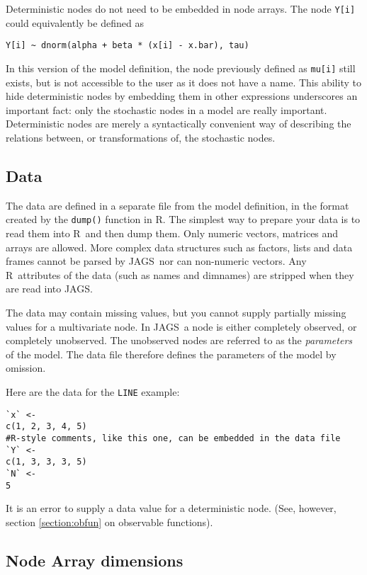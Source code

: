 \documentclass[11pt, a4paper, titlepage]{report}
\newcommand{\JAGS}{\textsf{JAGS}}
\newcommand{\R}{\textsf{R}}
\begin{document}
Deterministic nodes do not need to be embedded in node arrays. The
node \verb+Y[i]+ could equivalently be defined as
\begin{verbatim}
Y[i] ~ dnorm(alpha + beta * (x[i] - x.bar), tau)
\end{verbatim}
In this version of the model definition, the node previously defined
as \verb+mu[i]+ still exists, but is not accessible to the user as it
does not have a name.  This ability to hide deterministic nodes by
embedding them in other expressions underscores an important fact:
only the stochastic nodes in a model are really
important. Deterministic nodes are merely a syntactically convenient
way of describing the relations between, or transformations of, the
stochastic nodes.

\subsection{Data}
\label{section:data}

The data are defined in a separate file from the model definition, in
the format created by the \texttt{dump()} function in \R.  The
simplest way to prepare your data is to read them into \R\ and then
dump them.  Only numeric vectors, matrices and arrays are
allowed. More complex data structures such as factors, lists and data
frames cannot be parsed by \JAGS\, nor can non-numeric vectors.  Any
\R\ attributes of the data (such as names and dimnames) are stripped
when they are read into \JAGS.

The data may contain missing values, but you cannot supply partially
missing values for a multivariate node. In \JAGS\ a node is either
completely observed, or completely unobserved.  The unobserved nodes
are referred to as the {\em parameters} of the model. The data file
therefore defines the parameters of the model by omission.

Here are the data for the \verb+LINE+ example:
\begin{verbatim}
`x` <-
c(1, 2, 3, 4, 5)
#R-style comments, like this one, can be embedded in the data file
`Y` <-
c(1, 3, 3, 3, 5)
`N` <-
5
\end{verbatim}

It is an error to supply a data value for a deterministic node. (See, however,
section \ref{section:obfun} on observable functions).

\subsection{Node Array dimensions}
\end{document}
